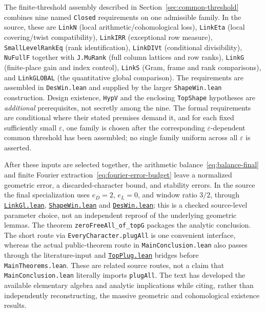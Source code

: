 \documentclass[11pt,openany,oneside]{scrbook}
\theoremstyle{definition}
\theoremstyle{remark}
\newcommand{\eps}{\varepsilon}
\newcommand{\baseurl}{https://github.com/CocoSgt/riemann-hypothesis-lean/blob/7cbf7a0c32fca1badf05931879a37c3f8a2b03b4/}
\newcommand{\sourcefile}[2]{\href{\baseurl#1}{\texttt{#2}}}
\begin{document}
The finite-threshold assembly described in Section~\ref{sec:common-threshold} combines nine named \texttt{Closed} requirements on one admissible family. In the source, these are \texttt{LinkN} (local arithmetic/cohomological loss), \texttt{LinkEta} (local covering/twist compatibility), \texttt{LinkIRR} (exceptional row measure), \texttt{SmallLevelRankEq} (rank identification), \texttt{LinkDIVt} (conditional divisibility), \texttt{NuFullF} together with \texttt{J.MuRank} (full column lattices and row ranks), \texttt{LinkG} (finite-place gain and index control), \texttt{LinkS} (Gram, frame and rank comparisons), and \texttt{LinkGLOBAL} (the quantitative global comparison). The requirements are assembled in \texttt{DesWin.lean} and supplied by the larger \texttt{ShapeWin.lean} construction. Design existence, \texttt{HypV} and the enclosing \texttt{TopShape} hypotheses are \emph{additional} prerequisites, not secretly among the nine. The formal requirements are conditional where their stated premises demand it, and for each fixed sufficiently small $\eps$, one family is chosen after the corresponding $\eps$-dependent common threshold has been assembled; no single family uniform across all $\eps$ is asserted.

After these inputs are selected together, the arithmetic balance~\eqref{eq:balance-final} and finite Fourier extraction~\eqref{eq:fourier-error-budget} leave a normalized geometric error, a discarded-character bound, and stability errors.  In the source the final specialization uses $e_D=2$, $e_L=0$, and window ratio $3/2$, through \sourcefile{src/Development/AbelianVarietyTheory/Proofs/GlobalInterpolation/LinkGl.lean}{LinkGl.lean}, \sourcefile{src/Development/AutomorphicArithmetic/CharacterBoxes/ShapeWin.lean}{ShapeWin.lean} and \sourcefile{src/Development/AutomorphicArithmetic/CharacterBoxes/DesWin.lean}{DesWin.lean}; this is a checked source-level parameter choice, not an independent reproof of the underlying geometric lemmas. The theorem \texttt{zeroFreeAll\_of\_topG} packages the analytic conclusion. The short route via \texttt{EveryCharacter.plugAll} is one convenient interface, whereas the actual public-theorem route in \texttt{MainConclusion.lean} also passes through the literature-input and \sourcefile{src/Development/AutomorphicArithmetic/ThetaCorrespondence/ThetaPairLifts/ThirdPlaceSeries/TopPlug.lean}{TopPlug.lean} bridges before \texttt{MainTheorems.lean}. These are related source routes, not a claim that \texttt{MainConclusion.lean} literally imports \texttt{plugAll}.  The text has developed the available elementary algebra and analytic implications while citing, rather than independently reconstructing, the massive geometric and cohomological existence results.
\end{document}
